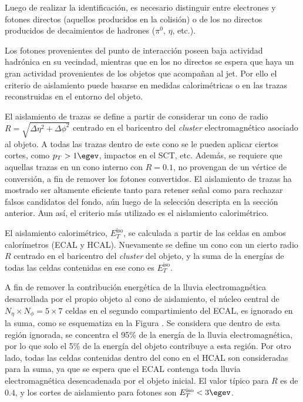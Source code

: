Luego de realizar la identificación, es necesario distinguir entre electrones y fotones directos (aquellos producidos en la colisión) o de los no directos producidos de decaimientos de hadrones ($\pi^{0}$, $\eta$, etc.).

Los fotones provenientes del punto de interacción poseen baja actividad hadrónica en su vecindad, mientras que en los no directos se espera que haya un gran actividad provenientes de los objetos que acompañan al jet. Por ello el criterio de aislamiento puede basarse en medidas calorimétricas o en las trazas reconstruidas en el entorno del objeto.

El aislamiento de trazas se define a partir de considerar un cono de radio $R=\sqrt{\Delta\eta^{2}+\Delta\phi^{2}}$ centrado en el baricentro del \textit{cluster} electromagnético asociado al objeto. A todas las trazas dentro de este cono se le pueden aplicar ciertos cortes, como $p_{T}>1 \egev$, impactos en el SCT, etc. Además, se requiere que aquellas trazas en un cono interno con $R=0.1$, no provengan de un vértice de conversión, a fin de remover los fotones convertidos. El aislamiento de trazas ha mostrado ser altamente eficiente tanto para retener señal como para rechazar falsos candidatos del fondo, aún luego de la selección descripta en la sección anterior. Aun así, el criterio más utilizado es el aislamiento calorimétrico.

El aislamiento calorimétrico, $E_{T}^{\text{iso}}$, se calculada a partir de las celdas en ambos calorímetros (ECAL y HCAL). Nuevamente se define un cono con un cierto radio $R$ centrado en el baricentro del \textit{cluster} del objeto, y la suma de la energías de todas las celdas contenidas en ese cono es $E_{T}^{\text{iso}}$. 

A fin de remover la contribución energética de la lluvia electromagnética desarrollada por el propio objeto al cono de aislamiento, el núcleo central de $N_{\eta}\times N_{\phi} = 5 \times 7$ celdas en el segundo compartimiento del ECAL, es ignorado en la suma, como se esquematiza en la Figura . Se considera que dentro de esta región ignorada, se concentra el 95\% de la energía de la lluvia electromagnética, por lo que solo el 5\% de la energía del objeto contribuye a esta región. Por otro lado, todas las celdas contenidas dentro del cono en el HCAL son consideradas para la suma, ya que se espera que el ECAL contenga toda lluvia electromagnética desencadenada por el objeto inicial. El valor típico para $R$ es de $0.4$, y los cortes de aislamiento para fotones son $E_{T}^{\text{iso}}<3 \egev$.



